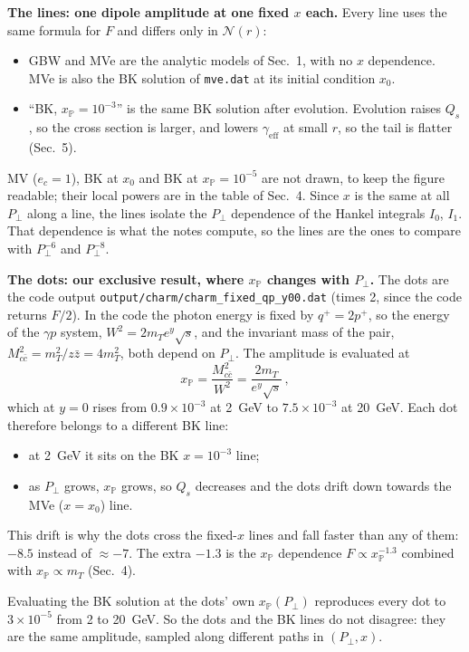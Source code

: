 \documentclass[12pt]{article}
\newcommand{\xpo}{x_{\mathbb{P}}}
\begin{document}
\textbf{The lines: one dipole amplitude at one fixed $x$ each.} Every line uses the same formula for $F$ and differs
only in $\mathcal N(r)$:
\begin{itemize}
\item GBW and MVe are the analytic models of Sec.~1, with no $x$ dependence. MVe is also the BK solution of
  \texttt{mve.dat} at its initial condition $x_0$.
\item ``BK, $\xpo=10^{-3}$'' is the same BK solution after evolution. Evolution raises $Q_s$, so the cross section is
  larger, and lowers $\gamma_{\mathrm{eff}}$ at small $r$, so the tail is flatter (Sec.~5).
\end{itemize}
MV ($e_c=1$), BK at $x_0$ and BK at $\xpo=10^{-5}$ are not drawn, to keep the figure readable; their local powers are in
the table of Sec.~4.
Since $x$ is the same at all $P_\perp$ along a line, the lines isolate the $P_\perp$ dependence of the Hankel integrals
$I_0$, $I_1$. That dependence is what the notes compute, so the lines are the ones to compare with $P_\perp^{-6}$ and
$P_\perp^{-8}$.

\textbf{The dots: our exclusive result, where $\xpo$ changes with $P_\perp$.} The dots are the code output
\texttt{output/charm/charm\_fixed\_qp\_y00.dat} (times 2, since the code returns $F/2$). In the code the photon
energy is fixed by $q^+=2p^+$, so the energy of the $\gamma p$ system, $W^2=2m_Te^y\sqrt s$, and the invariant mass
of the pair, $M_{c\bar c}^2=m_T^2/z\bar z=4m_T^2$, both depend on $P_\perp$. The amplitude is evaluated at
\begin{equation}
\xpo=\frac{M_{c\bar c}^2}{W^2}=\frac{2m_T}{e^y\sqrt s}\,,
\end{equation}
which at $y=0$ rises from $0.9\times10^{-3}$ at 2~GeV to $7.5\times10^{-3}$ at 20~GeV. Each dot therefore belongs to a
different BK line:
\begin{itemize}
\item at 2~GeV it sits on the BK $x=10^{-3}$ line;
\item as $P_\perp$ grows, $\xpo$ grows, so $Q_s$ decreases and the dots drift down towards the MVe ($x=x_0$) line.
\end{itemize}
This drift is why the dots cross the fixed-$x$ lines and fall faster than any of them: $-8.5$ instead of $\approx-7$.
The extra $-1.3$ is the $\xpo$ dependence $F\propto\xpo^{-1.3}$ combined with $\xpo\propto m_T$ (Sec.~4).

Evaluating the BK solution at the dots' own $\xpo(P_\perp)$ reproduces every dot to $3\times10^{-5}$ from 2 to
20~GeV. So the dots and the BK lines do not disagree: they are the same amplitude, sampled along different paths in
$(P_\perp,x)$.
\end{document}
